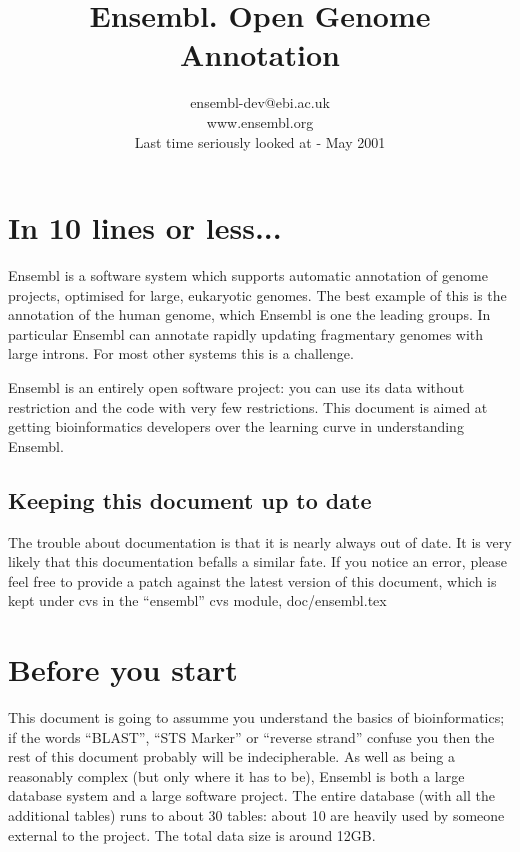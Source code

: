 \documentclass[11pt,a4paper]{article}
\begin{document}
\title{Ensembl. Open Genome Annotation}
\author{ensembl-dev@ebi.ac.uk\\www.ensembl.org\\Last time seriously looked at - May 2001}


\maketitle

\newpage
\tableofcontents
\newpage

 
\newpage

\section{In 10 lines or less...}

Ensembl is a software system which supports automatic annotation of
genome projects, optimised for large, eukaryotic genomes. The best
example of this is the annotation of the human genome, which Ensembl
is one the leading groups. In particular Ensembl can annotate rapidly
updating fragmentary genomes with large introns. For most other systems
this is a challenge.

Ensembl is an entirely open software project: you can use its data
without restriction and the code with very few restrictions. This
document is aimed at getting bioinformatics developers over the
learning curve in understanding Ensembl.

\subsection{Keeping this document up to date}

The trouble about documentation is that it is nearly always out of
date. It is very likely that this documentation befalls a similar fate.
If you notice an error, please feel free to provide a patch against
the latest version of this document, which is kept under cvs in 
the ``ensembl'' cvs module, doc/ensembl.tex

\section{Before you start}

This document is going to assumme you understand the basics of
bioinformatics; if the words ``BLAST'', ``STS Marker'' or ``reverse
strand'' confuse you then the rest of this document probably will be
indecipherable. As well as being a reasonably complex (but only where
it has to be), Ensembl is both a large database system and a
large software project. The entire database (with all the additional
tables) runs to about 30 tables: about 10 are heavily used by someone
external to the project. The total data size is around 12GB. 
\end{document}
